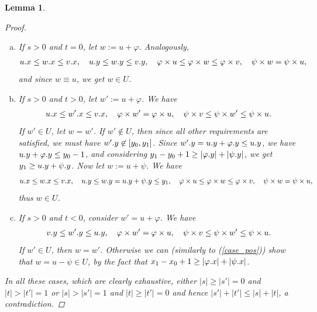 \documentclass[a4paper,11pt]{article}
\newtheorem{lemma}{Lemma}[section]
\renewcommand{\phi}{\varphi}
\newcommand{\eq}[1]{\begin{align*} #1 \end{align*}}
\newcommand{\absolute}[1]{\left\lvert#1\right\rvert}
\begin{document}
\begin{lemma}
\begin{proof}
\begin{enumerate}[(a)]
			\item If $s > 0$ and $t = 0$, let $w := u + \phi$. Analogously, 
				\eq{
					\x{u} \le \x{w} \le \x{v}, \quad \y{u} \le \y{w} \le \y{v}, \quad \h{u} \le \h{w} \le \h{v}, \quad \s{w} = \s{u},
				}
				and since $w \equiv u$, we get $w \in U$. 
			
			\item If $s > 0$ and $t > 0$, let $w' := u + \phi$. \label{case_pos}
				We have \eq{
					\x{u} \le \x{w'} \le \x{v}, \quad \h{w'} = \h{u}, \quad \s{v} \le \s{w'} \le \s{u}.
				}
				If $w' \in U$, let $w = w'$.
				If $w' \not \in U$, then since all other requirements are satisfied, we must have $w'.y \not \in [y_0, y_1]$.
				Since $\y{w'} = \y{u} + \y{\phi} \le \y{u}$, we have $\y{u} + \y{\phi} \le y_0 - 1$, and
				considering $y_1 - y_0 + 1 \ge \absolute{\y{\phi}} + \absolute{\y{\psi}}$, we get $y_1 \ge u.y + \psi.y$.
				Now let $w := u + \psi$.
				We have \eq{
					\x{u} \le \x{w} \le \x{v}, \quad \y{u} \le \y{w} = \y{u} + \y{\psi} \le y_1, \quad \h{u} \le \h{w} \le \h{v}, \quad \s{w} = \s{u},
				}
				thus $w \in U$.
			\item If $s > 0$ and $t < 0$, consider $w' = u + \phi$.
				We have \eq{
					\y{v} \le \y{w'} \le \y{u}, \quad \h{w'} = \h{u}, \quad \s{v} \le \s{w'} \le \s{u}.
				}
				If $w' \in U$, then $w = w'$.
				Otherwise we can (similarly to (\ref{case_pos})) show that $w = u - \psi \in U$, by the fact that $x_1 - x_0 + 1 \ge \absolute{\x{\phi}} + \absolute{\x{\psi}}$. 
		\end{enumerate}
		In all these cases, which are clearly exhaustive, either $\absolute{s} \ge \absolute{s'} = 0$ and $\absolute{t} > \absolute{t'} = 1$ or $\absolute{s} > \absolute{s'} = 1$ and $\absolute{t} \ge \absolute{t'} = 0$ and hence $\absolute{s'}+\absolute{t'} \le \absolute{s}+\absolute{t}$, a contradiction. 
	\end{proof}
\end{lemma}


\end{document}
